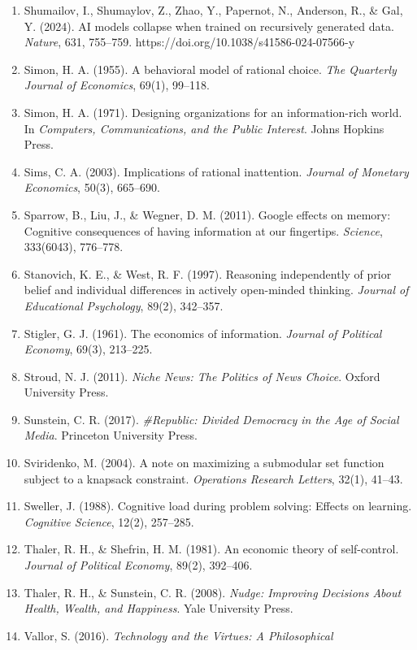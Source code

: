 \documentclass[
  11pt]{article}
\begin{document}
\begin{enumerate}
\item
  Shumailov, I., Shumaylov, Z., Zhao, Y., Papernot, N., Anderson, R., \&
  Gal, Y. (2024). AI models collapse when trained on recursively
  generated data. \emph{Nature}, 631, 755--759.
  https://doi.org/10.1038/s41586-024-07566-y
\item
  Simon, H. A. (1955). A behavioral model of rational choice. \emph{The
  Quarterly Journal of Economics}, 69(1), 99--118.
\item
  Simon, H. A. (1971). Designing organizations for an information-rich
  world. In \emph{Computers, Communications, and the Public Interest}.
  Johns Hopkins Press.
\item
  Sims, C. A. (2003). Implications of rational inattention.
  \emph{Journal of Monetary Economics}, 50(3), 665--690.
\item
  Sparrow, B., Liu, J., \& Wegner, D. M. (2011). Google effects on
  memory: Cognitive consequences of having information at our
  fingertips. \emph{Science}, 333(6043), 776--778.
\item
  Stanovich, K. E., \& West, R. F. (1997). Reasoning independently of
  prior belief and individual differences in actively open-minded
  thinking. \emph{Journal of Educational Psychology}, 89(2), 342--357.
\item
  Stigler, G. J. (1961). The economics of information. \emph{Journal of
  Political Economy}, 69(3), 213--225.
\item
  Stroud, N. J. (2011). \emph{Niche News: The Politics of News Choice}.
  Oxford University Press.
\item
  Sunstein, C. R. (2017). \emph{\#Republic: Divided Democracy in the Age
  of Social Media}. Princeton University Press.
\item
  Sviridenko, M. (2004). A note on maximizing a submodular set function
  subject to a knapsack constraint. \emph{Operations Research Letters},
  32(1), 41--43.
\item
  Sweller, J. (1988). Cognitive load during problem solving: Effects on
  learning. \emph{Cognitive Science}, 12(2), 257--285.
\item
  Thaler, R. H., \& Shefrin, H. M. (1981). An economic theory of
  self-control. \emph{Journal of Political Economy}, 89(2), 392--406.
\item
  Thaler, R. H., \& Sunstein, C. R. (2008). \emph{Nudge: Improving
  Decisions About Health, Wealth, and Happiness}. Yale University Press.
\item
  Vallor, S. (2016). \emph{Technology and the Virtues: A Philosophical
}
\end{enumerate}
\end{document}
